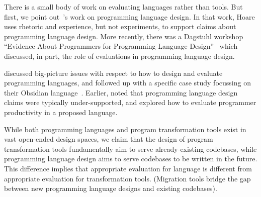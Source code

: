 \begin{center}
\end{center}

There is a small body of work on evaluating languages rather than tools.
But first, we point out~'s work on programming language
design. In that work, Hoare uses rhetoric and experience, but not experiments,
to support claims about programming language design. More recently,
there was a Dagstuhl workshop ``Evidence About Programmers for Programming
Language Design''~\cite{stefik18:_eviden_about_progr_progr_languag_desig} which discussed, in part, the role of evaluations in programming language design.


discussed big-picture issues with respect to how to design and evaluate programming languages, and followed up with a specific case study focussing on their Obsidian
language~\cite{coblenz20:_can_advan_type_system_be_usabl}.
Earlier,  noted that programming 
language design claims were typically under-supported, and  explored how to evaluate programmer productivity in a
proposed language. 

While both programming languages and program transformation tools exist
in vast open-ended design spaces, we claim that the design of program transformation
tools fundamentally aim to serve already-existing codebases, while programming 
language design aims to serve codebases to be written in the future.
This difference implies that appropriate evaluation for language is different 
from appropriate evaluation for transformation tools.
(Migration tools bridge the gap between new programming language designs
and existing codebases).

